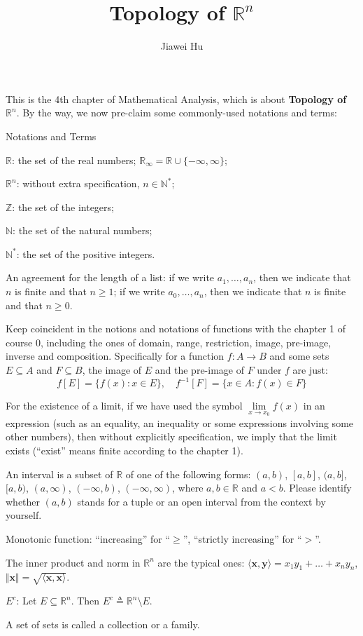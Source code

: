 \documentclass{article}
\title{\LARGE \textbf{Topology of $\mathbb{R}^n$}}
\author{\large Jiawei Hu}
\begin{document}
\maketitle

This is the 4th chapter of Mathematical Analysis, which is about \textbf{Topology of $\mathbb{R}^n$}. By the way, we now pre-claim some commonly-used notations and terms:
\begin{Df}{Notations and Terms}
    \begin{compactenum}
        \item $\mathbb{R}$: the set of the real numbers; $\mathbb{R}_\infty = \mathbb{R}\cup\{-\infty, \infty\}$;
        \item $\mathbb{R}^n$: without extra specification, $n\in\mathbb{N}^\ast$; 
        \item $\mathbb{Z}$: the set of the integers;
        \item $\mathbb{N}$: the set of the natural numbers;
        \item $\mathbb{N^\ast}$: the set of the positive integers.
        \item An agreement for the length of a list: if we write $a_1, \dots, a_n$, then we indicate that $n$ is finite and that $n\geq 1$; if we write $a_0, \dots, a_n$, then we indicate that $n$ is finite and that $n\geq 0$.
        \item Keep coincident in the notions and notations of functions with the chapter 1 of course 0, including the ones of domain, range, restriction, image, pre-image, inverse and composition. Specifically for a function $f: A\rightarrow B$ and some sets $E\subseteq A$ and $F\subseteq B$, the image of $E$ and the pre-image of $F$ under $f$ are just:
        $$f[E] = \{f(x): x\in E\},\quad f^{-1}[F] = \{x\in A: f(x)\in F\}$$
        \item For the existence of a limit, if we have used the symbol $\lim\limits_{x\to x_0} f(x)$ in an expression (such as an equality, an inequality or some expressions involving some other numbers), then without explicitly specification, we imply that the limit exists (``exist'' means finite according to the chapter 1).
        \item An interval is a subset of $\mathbb{R}$ of one of the following forms: $(a,b)$, $[a,b]$, $(a,b]$, $[a,b)$, $(a, \infty)$, $(-\infty, b)$, $(-\infty, \infty)$, where $a, b\in\mathbb{R}$ and $a<b$. Please identify whether $(a,b)$ stands for a tuple or an open interval from the context by yourself.
        \item Monotonic function: ``increasing'' for ``$\geq$'', ``strictly increasing'' for ``$>$''.
        \item The inner product and norm in $\mathbb{R}^n$ are the typical ones: $\langle \pmb{x}, \pmb{y}\rangle = x_1y_1 + \dots + x_ny_n$, $\Vert \pmb{x}\Vert = \sqrt{\langle \pmb{x}, \pmb{x}\rangle}$.
        \item $E^c$: Let $E\subseteq\mathbb{R}^n$. Then $E^c\triangleq \mathbb{R}^n\setminus E$.
        \item A set of sets is called a collection or a family.
    \end{compactenum}
\end{Df}
\end{document}
